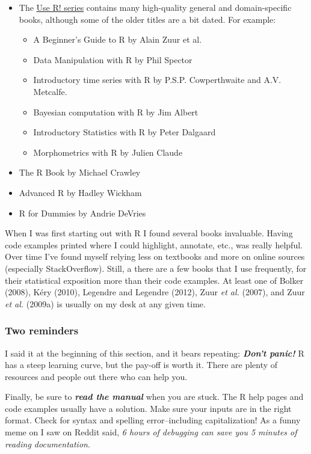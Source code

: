 \documentclass[
  13,
  letterpaper,
]{report}
\providecommand{\tightlist}{%
  \setlength{\itemsep}{0pt}\setlength{\parskip}{0pt}}
\begin{document}
\begin{itemize}
\tightlist
\item
  The \href{https://www.springer.com/series/6991}{Use R! series}
  contains many high-quality general and domain-specific books, although
  some of the older titles are a bit dated. For example:

  \begin{itemize}
  \tightlist
  \item
    A Beginner's Guide to R by Alain Zuur et al.
  \item
    Data Manipulation with R by Phil Spector
  \item
    Introductory time series with R by P.S.P. Cowperthwaite and A.V.
    Metcalfe.
  \item
    Bayesian computation with R by Jim Albert
  \item
    Introductory Statistics with R by Peter Dalgaard
  \item
    Morphometrics with R by Julien Claude
  \end{itemize}
\item
  The R Book by Michael Crawley
\item
  Advanced R by Hadley Wickham
\item
  R for Dummies by Andrie DeVries
\end{itemize}

When I was first starting out with R I found several books invaluable.
Having code examples printed where I could highlight, annotate, etc.,
was really helpful. Over time I've found myself relying less on
textbooks and more on online sources (especially StackOverflow). Still,
a there are a few books that I use frequently, for their statistical
exposition more than their code examples. At least one of Bolker (2008),
Kéry (2010), Legendre and Legendre (2012), Zuur \emph{et al.} (2007),
and Zuur \emph{et al.} (2009a) is usually on my desk at any given time.

\subsubsection{Two reminders}\label{sec-02-faq-help-two}

I said it at the beginning of this section, and it bears repeating:
\textbf{\emph{Don't panic!}} R has a steep learning curve, but the
pay-off is worth it. There are plenty of resources and people out there
who can help you.

Finally, be sure to \textbf{\emph{read the manual}} when you are stuck.
The R help pages and code examples usually have a solution. Make sure
your inputs are in the right format. Check for syntax and spelling
error--including capitalization! As a funny meme on I saw on Reddit
said, \emph{6 hours of debugging can save you 5 minutes of reading
documentation}.
\end{document}

